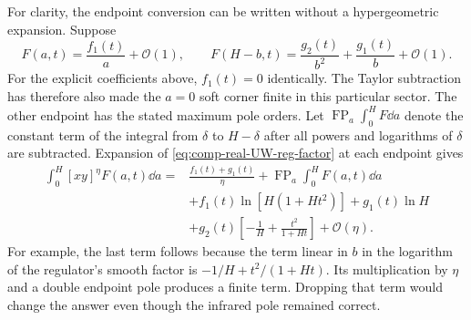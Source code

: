 For clarity, the endpoint conversion can be written without a
hypergeometric expansion. Suppose
\begin{equation}
 F(a,t)=\frac{f_1(t)}a+\mathcal O(1),\qquad
 F(H-b,t)=\frac{g_2(t)}{b^2}+\frac{g_1(t)}b+\mathcal O(1).
\end{equation}
For the explicit coefficients above, $f_1(t)=0$ identically.
The Taylor subtraction has therefore also made the $a=0$ soft
corner finite in this particular sector. The other endpoint has
the stated maximum pole orders.
Let $\operatorname{FP}_a\int_0^H F\dd a$ denote the constant term
of the integral from $\delta$ to $H-\delta$ after all powers and
logarithms of $\delta$ are subtracted. Expansion of
\eqref{eq:comp-real-UW-reg-factor} at each endpoint gives
\begin{align}
 \int_0^H[xy]^\eta F(a,t)\dd a
 ={}&\frac{f_1(t)+g_1(t)}\eta
       +\operatorname{FP}_a\int_0^H F(a,t)\dd a\\
 &+f_1(t)\ln[H(1+Ht^2)]+g_1(t)\ln H\\
 &+g_2(t)\left[-\frac1H+\frac{t^2}{1+Ht}\right]
       +\mathcal O(\eta).
 \label{eq:comp-real-UW-eta-finite}
\end{align}
For example, the last term follows because the term linear in
$b$ in the logarithm of the regulator's smooth factor is
$-1/H+t^2/(1+Ht)$. Its multiplication by $\eta$ and a double
endpoint pole produces a finite term. Dropping that term would
change the answer even though the infrared pole remained correct.

